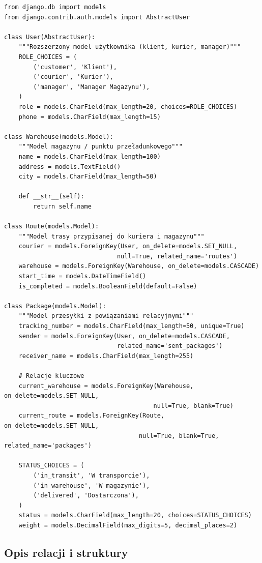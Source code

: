 \begin{verbatim}
from django.db import models
from django.contrib.auth.models import AbstractUser

class User(AbstractUser):
    """Rozszerzony model użytkownika (klient, kurier, manager)"""
    ROLE_CHOICES = (
        ('customer', 'Klient'),
        ('courier', 'Kurier'),
        ('manager', 'Manager Magazynu'),
    )
    role = models.CharField(max_length=20, choices=ROLE_CHOICES)
    phone = models.CharField(max_length=15)

class Warehouse(models.Model):
    """Model magazynu / punktu przeładunkowego"""
    name = models.CharField(max_length=100)
    address = models.TextField()
    city = models.CharField(max_length=50)

    def __str__(self):
        return self.name

class Route(models.Model):
    """Model trasy przypisanej do kuriera i magazynu"""
    courier = models.ForeignKey(User, on_delete=models.SET_NULL, 
                               null=True, related_name='routes')
    warehouse = models.ForeignKey(Warehouse, on_delete=models.CASCADE)
    start_time = models.DateTimeField()
    is_completed = models.BooleanField(default=False)

class Package(models.Model):
    """Model przesyłki z powiązaniami relacyjnymi"""
    tracking_number = models.CharField(max_length=50, unique=True)
    sender = models.ForeignKey(User, on_delete=models.CASCADE, 
                               related_name='sent_packages')
    receiver_name = models.CharField(max_length=255)
    
    # Relacje kluczowe
    current_warehouse = models.ForeignKey(Warehouse, on_delete=models.SET_NULL, 
                                         null=True, blank=True)
    current_route = models.ForeignKey(Route, on_delete=models.SET_NULL, 
                                     null=True, blank=True, related_name='packages')
    
    STATUS_CHOICES = (
        ('in_transit', 'W transporcie'),
        ('in_warehouse', 'W magazynie'),
        ('delivered', 'Dostarczona'),
    )
    status = models.CharField(max_length=20, choices=STATUS_CHOICES)
    weight = models.DecimalField(max_digits=5, decimal_places=2)
\end{verbatim}

\subsection*{Opis relacji i struktury}

